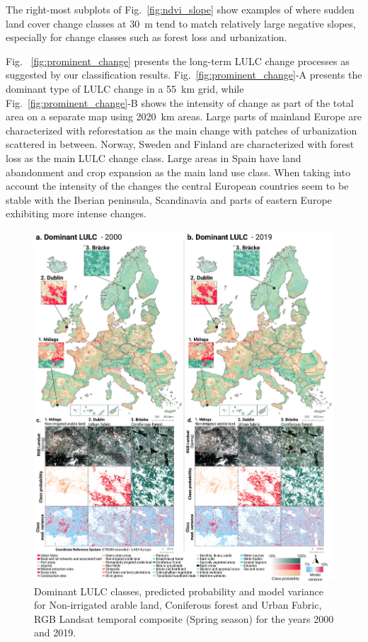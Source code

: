      The right-most subplots of Fig.\@~\ref{fig:ndvi_slope} show examples of where sudden land cover change classes at 30~m tend to match relatively large negative slopes, especially for change classes such as forest loss and urbanization.
    
    Fig. \@~\ref{fig:prominent_change} presents the long-term LULC change processes as suggested by our classification results. Fig.\@~\ref{fig:prominent_change}-A presents the dominant type of LULC change in a 5{\texttimes}5~km grid, while Fig.\@~\ref{fig:prominent_change}-B shows the intensity of change as part of the total area on a separate map using 20{\texttimes}20~km areas. Large parts of mainland Europe are characterized with reforestation as the main change with patches of urbanization scattered in between. Norway, Sweden and Finland are characterized with forest loss as the main LULC change class. Large areas in Spain have land abandonment and crop expansion as the main land use class. 
    When taking into account the intensity of the changes the central European countries seem to be stable with the Iberian peninsula, Scandinavia and parts of eastern Europe exhibiting more intense changes.
    
    \begin{figure}[!hp]
    \vspace*{-1.5cm}
    \hspace*{-3.5cm}
    \includegraphics[width=1.3\textwidth]{figs_03/results_landcover.png}
    \caption{Dominant LULC classes, predicted probability and model variance for Non-irrigated arable land, Coniferous forest and Urban Fabric, RGB Landsat temporal composite (Spring season) for the years 2000 and 2019.}
    \label{fig:landcover}
    \end{figure}
    

